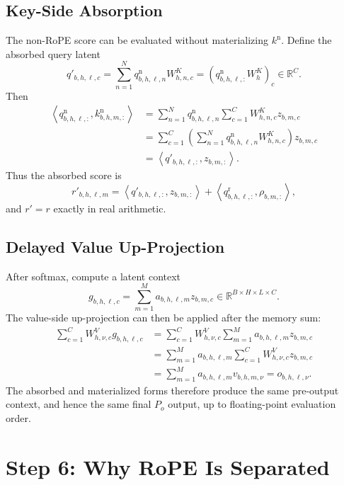 \documentclass[11pt]{article}
\newcommand{\R}{\mathbb{R}}
\begin{document}
\subsection{Key-Side Absorption}

The non-RoPE score can be evaluated without materializing
$k^{\mathrm n}$.  Define the absorbed query latent
\[
  q'_{b,h,\ell,c}
  =
  \sum_{n=1}^N q^{\mathrm n}_{b,h,\ell,n} W^K_{h,n,c}
  =
  \left(q^{\mathrm n}_{b,h,\ell,:} W^K_h\right)_c
  \in\R^C.
\]
Then
\[
\begin{aligned}
  \left\langle q^{\mathrm n}_{b,h,\ell,:}, k^{\mathrm n}_{b,h,m,:}\right\rangle
  &=
  \sum_{n=1}^N q^{\mathrm n}_{b,h,\ell,n}
      \sum_{c=1}^C W^K_{h,n,c}z_{b,m,c} \\
  &=
  \sum_{c=1}^C
      \left(\sum_{n=1}^N q^{\mathrm n}_{b,h,\ell,n}W^K_{h,n,c}\right)
      z_{b,m,c} \\
  &=
  \left\langle q'_{b,h,\ell,:},z_{b,m,:}\right\rangle .
\end{aligned}
\]
Thus the absorbed score is
\[
  r'_{b,h,\ell,m}
  =
  \left\langle q'_{b,h,\ell,:},z_{b,m,:}\right\rangle
  +
  \left\langle q^{\mathrm r}_{b,h,\ell,:},\rho_{b,m,:}\right\rangle,
\]
and $r'=r$ exactly in real arithmetic.

\subsection{Delayed Value Up-Projection}

After softmax, compute a latent context
\[
  g_{b,h,\ell,c}=\sum_{m=1}^M a_{b,h,\ell,m}z_{b,m,c}
  \in\R^{B\times H\times L\times C}.
\]
The value-side up-projection can then be applied after the memory sum:
\[
\begin{aligned}
  \sum_{c=1}^C W^V_{h,\nu,c}g_{b,h,\ell,c}
  &=
  \sum_{c=1}^C W^V_{h,\nu,c}
    \sum_{m=1}^M a_{b,h,\ell,m}z_{b,m,c} \\
  &=
  \sum_{m=1}^M a_{b,h,\ell,m}
    \sum_{c=1}^C W^V_{h,\nu,c}z_{b,m,c} \\
  &=
  \sum_{m=1}^M a_{b,h,\ell,m}v_{b,h,m,\nu}
  =
  o_{b,h,\ell,\nu}.
\end{aligned}
\]
The absorbed and materialized forms therefore produce the same pre-output
context, and hence the same final $P_o$ output, up to floating-point evaluation
order.

\section{Step 6: Why RoPE Is Separated}
\end{document}
